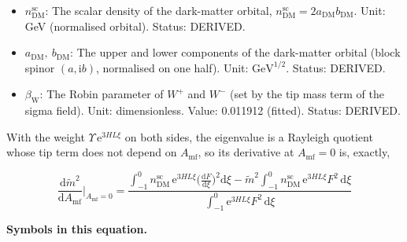 \documentclass[
  10pt,
]{article}
\begin{document}
\begin{itemize}
  \(x_0\) problem of the gauge fields (a bookkeeping parameter: the
  result is linear in it). Unit: \(\mathrm{GeV}^{-1}\) (with the orbital
  normalisation). Status: DERIVED.
\item
  \(n^{\mathrm{sc}}_{\mathrm{DM}}\): The scalar density of the
  dark-matter orbital,
  \(n^{\mathrm{sc}}_{\mathrm{DM}} = 2a_{\mathrm{DM}}b_{\mathrm{DM}}\).
  Unit: GeV (normalised orbital). Status: DERIVED.
\item
  \(a_{\mathrm{DM}},\ b_{\mathrm{DM}}\): The upper and lower components
  of the dark-matter orbital (block spinor \((a, \mathrm{i}b)\),
  normalised on one half). Unit: \(\mathrm{GeV}^{1/2}\). Status:
  DERIVED.
\item
  \(\beta_{\mathrm{W}}\): The Robin parameter of \(W^+\) and \(W^-\)
  (set by the tip mass term of the sigma field). Unit: dimensionless.
  Value: 0.011912 (fitted). Status: DERIVED.
\end{itemize}

With the weight \(\Upsilon\,\mathrm{e}^{3HL\xi}\) on both sides, the
eigenvalue is a Rayleigh quotient whose tip term does not depend on
\(A_{\mathrm{mf}}\), so its derivative at \(A_{\mathrm{mf}} = 0\) is,
exactly,

\[
\frac{\mathrm{d}\tilde m^2}{\mathrm{d}A_{\mathrm{mf}}}\bigg\vert_{A_{\mathrm{mf}} = 0}
 = \frac{\displaystyle\int_{-1}^{0}n^{\mathrm{sc}}_{\mathrm{DM}}\,\mathrm{e}^{3HL\xi}\Big(\frac{\mathrm{d}F}{\mathrm{d}\xi}\Big)^2\mathrm{d}\xi
 - \tilde m^2\int_{-1}^{0}n^{\mathrm{sc}}_{\mathrm{DM}}\,\mathrm{e}^{3HL\xi}F^2\,\mathrm{d}\xi}
 {\displaystyle\int_{-1}^{0}\mathrm{e}^{3HL\xi}F^2\,\mathrm{d}\xi}
\]

\textbf{Symbols in this equation.}
\end{document}
